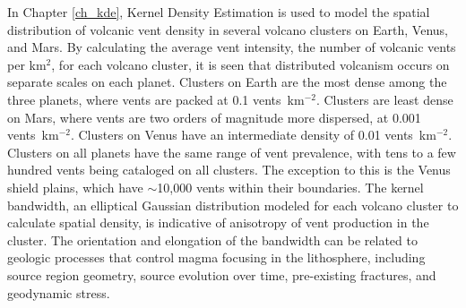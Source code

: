 In Chapter \ref{ch_kde}, Kernel Density Estimation is used to model the spatial distribution of volcanic vent density in several volcano clusters on Earth, Venus, and Mars. By calculating the average vent intensity, the number of volcanic vents per km$^2$, for each volcano cluster, it is seen that distributed volcanism occurs on separate scales on each planet. Clusters on Earth are the most dense among the three planets, where vents are packed at 0.1 vents~km$^{-2}$. Clusters are least dense on Mars, where vents are two orders of magnitude more dispersed, at 0.001 vents~km$^{-2}$. Clusters on Venus have an intermediate density of 0.01 vents~km$^{-2}$. Clusters on all planets have the same range of vent prevalence, with tens to a few hundred vents being cataloged on all clusters. The exception to this is the Venus shield plains, which have $\sim$10,000 vents within their boundaries. The kernel bandwidth, an elliptical Gaussian distribution modeled for each volcano cluster to calculate spatial density, is indicative of anisotropy of vent production in the cluster. The orientation and elongation of the bandwidth can be related to geologic processes that control magma focusing in the lithosphere, including source region geometry, source evolution over time, pre-existing fractures, and geodynamic stress.



% 
